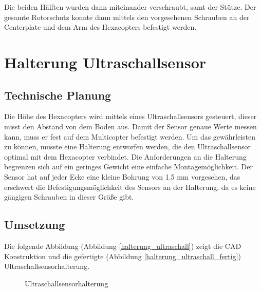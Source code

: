 Die beiden Hälften wurden dann miteinander verschraubt, samt der Stütze.
Der gesamte Rotorschutz konnte dann mittels den vorgesehenen Schrauben an der Centerplate und dem Arm des Hexacopters befestigt werden.

			\newpage

\section{Halterung Ultraschallsensor}

	\subsection{Technische Planung}

	Die Höhe des Hexacopters wird mittels eines Ultraschallsensors gesteuert, dieser misst den Abstand von dem Boden aus.
	Damit der Sensor genaue Werte messen kann, muss er fest auf dem Multicopter befestigt werden.
	Um das gewährleisten zu können, musste eine Halterung entworfen werden, die den Ultraschallsensor optimal mit dem Hexacopter verbindet.
	Die Anforderungen an die Halterung begrenzen sich auf ein geringes Gewicht \bzw eine einfache Montagemöglichkeit.
	Der Sensor hat auf jeder Ecke eine kleine Bohrung von 1.5 mm vorgesehen, das erschwert die Befestigungsmöglichkeit des Sensors an der Halterung, da es keine gängigen Schrauben in dieser Größe gibt.

	\subsection{Umsetzung}

	Die folgende Abbildung (Abbildung \ref{halterung_ultraschall}) zeigt die CAD Konstruktion und die gefertigte (Abbildung \ref{halterung_ultraschall_fertig}) Ultraschallsensorhalterung.

			\begin{figure}[H]
				\begin{centering}
				\par\end{centering}
				\caption{Ultraschallsensorhalterung}
				\label{Halterung_Ultraschallsensor}
			\end{figure}

